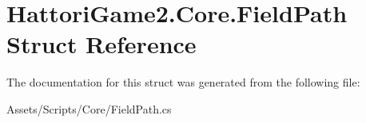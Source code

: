 \hypertarget{struct_hattori_game2_1_1_core_1_1_field_path}{}\section{Hattori\+Game2.\+Core.\+Field\+Path Struct Reference}
\label{struct_hattori_game2_1_1_core_1_1_field_path}


The documentation for this struct was generated from the following file\+:\begin{DoxyCompactItemize}
\item 
Assets/\+Scripts/\+Core/Field\+Path.\+cs\end{DoxyCompactItemize}
